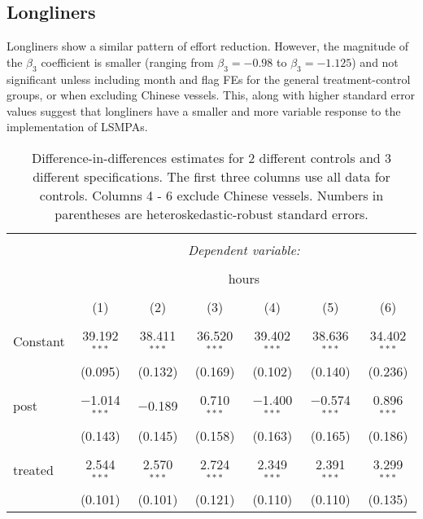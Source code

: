 \documentclass[11pt,]{article}
\begin{document}
\hypertarget{longliners}{%
\subsection{Longliners}\label{longliners}}

Longliners show a similar pattern of effort reduction. However, the
magnitude of the \(\beta_3\) coefficient is smaller (ranging from
\(\beta_3 = -0.98\) to \(\beta_3 = -1.125\)) and not significant unless
including month and flag FEs for the general treatment-control groups,
or when excluding Chinese vessels. This, along with higher standard
error values suggest that longliners have a smaller and more variable
response to the implementation of LSMPAs.

\begin{table}[!htbp] \centering 
  \caption{\label{tab:long}Difference-in-differences estimates for 2 different controls and 3 different specifications. The first three columns use all data for controls. Columns 4 - 6 exclude Chinese vessels. Numbers in parentheses are heteroskedastic-robust standard errors.} 
  \label{} 
\small 
\begin{tabular}{@{\extracolsep{1pt}}lcccccc} 
\\[-1.8ex]\hline 
\hline \\[-1.8ex] 
 & \multicolumn{6}{c}{\textit{Dependent variable:}} \\ 
\cline{2-7} 
\\[-1.8ex] & \multicolumn{6}{c}{hours} \\ 
\\[-1.8ex] & (1) & (2) & (3) & (4) & (5) & (6)\\ 
\hline \\[-1.8ex] 
 Constant & 39.192$^{***}$ & 38.411$^{***}$ & 36.520$^{***}$ & 39.402$^{***}$ & 38.636$^{***}$ & 34.402$^{***}$ \\ 
  & (0.095) & (0.132) & (0.169) & (0.102) & (0.140) & (0.236) \\ 
  & & & & & & \\ 
 post & $-$1.014$^{***}$ & $-$0.189 & 0.710$^{***}$ & $-$1.400$^{***}$ & $-$0.574$^{***}$ & 0.896$^{***}$ \\ 
  & (0.143) & (0.145) & (0.158) & (0.163) & (0.165) & (0.186) \\ 
  & & & & & & \\ 
 treated & 2.544$^{***}$ & 2.570$^{***}$ & 2.724$^{***}$ & 2.349$^{***}$ & 2.391$^{***}$ & 3.299$^{***}$ \\ 
  & (0.101) & (0.101) & (0.121) & (0.110) & (0.110) & (0.135) \\ 

\end{tabular}
\end{table}
\end{document}
